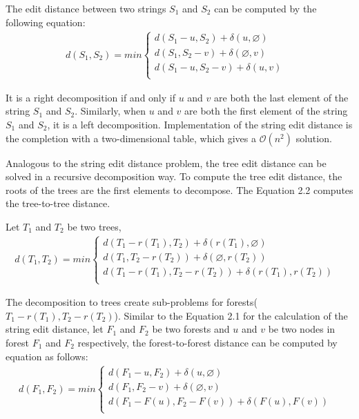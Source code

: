 The edit distance between two strings $S_1$ and $S_2$ can be computed by the following equation:
\begin{align}
d(S_1, S_2) = min \begin{cases}
	  	d(S_1 - u , S_2) + \delta(u, \varnothing) \\ 
      	d(S_1, S_2 - v) + \delta(\varnothing, v) \\ 
    	d(S_1 - u, S_2 - v) + \delta(u, v) & \\ 
    \end{cases}
\end{align}

It is a right decomposition if and only if $u$ and $v$ are both the last element of the string $S_1$ and $S_2$. Similarly, when $u$ and $v$ are both the first element of the string $S_1$ and $S_2$, it is a left decomposition. Implementation of the string edit distance is the completion with a two-dimensional table, which gives a $\mathcal{O}(n^2)$ solution.

Analogous to the string edit distance problem, the tree edit distance can be solved in a recursive decomposition way. To compute the tree edit distance,  the roots of the trees are the first elements to decompose. The Equation 2.2 computes the tree-to-tree distance.

Let $T_1$ and $T_2$ be two trees, 
\begin{align}
d(T_1, T_2) = min \begin{cases}
	  	d(T_1 - r(T_1) , T_2) + \delta(r(T_1), \varnothing) \\ 
      	d(T_1, T_2 - r(T_2)) + \delta(\varnothing, r(T_2)) \\ 
    	d(T_1 - r(T_1), T_2 - r(T_2)) + \delta(r(T_1), r(T_2)) & \\
    \end{cases}
\end{align}

The decomposition to trees create sub-problems for forests($T_1 - r(T_1), T_2 - r(T_2)$). Similar to the Equation 2.1 for the calculation of the string edit distance, let $F_1$ and $F_2$ be two forests and $u$ and $v$ be two nodes in forest $F_1$ and $F_2$ respectively, the forest-to-forest distance can be computed by equation as follows: 
\begin{align}
d(F_1, F_2) = min \begin{cases}
	  	d(F_1 - u , F_2) + \delta(u, \varnothing) \\ 
      	d(F_1, F_2 - v) + \delta(\varnothing, v) \\ 
    	d(F_1 - F(u), F_2 - F(v)) + \delta(F(u), F(v))& \\ 
    \end{cases}
\end{align}

